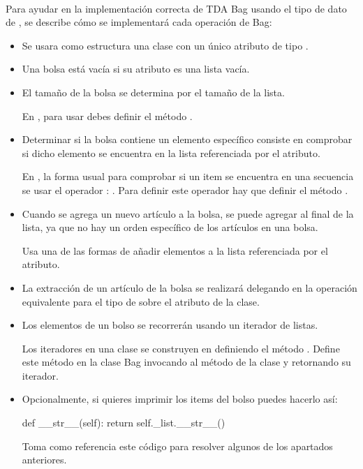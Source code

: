 
\

Para ayudar en la implementación correcta de TDA Bag  usando el tipo de dato  de , se describe cómo se implementará cada operación de Bag:
\begin{itemize}
\item Se usara como estructura una clase con un único atributo de tipo .

\item Una bolsa está vacía si su atributo es una lista vacía.

\item El tamaño de la bolsa se determina por el tamaño de la lista.

En , para usar  debes definir el método .
 
\item Determinar si la bolsa contiene un elemento específico consiste en comprobar si dicho elemento se encuentra en la lista referenciada por el atributo.

En , la forma usual para comprobar si un item se encuentra en una secuencia se usar el operador : . Para definir este operador hay que definir el método .

\item Cuando se agrega un nuevo artículo a la bolsa, se puede agregar al final de la lista, ya que no hay un orden específico de los artículos en una bolsa.

Usa una de las formas de añadir elementos a la lista referenciada por el atributo.

\item La extracción de un artículo de la bolsa se realizará delegando en la operación equivalente para el tipo  de  sobre el atributo de la clase.

\item Los elementos de un bolso se recorrerán usando un iterador de listas.

Los iteradores en una clase se construyen en  definiendo el método .
Define este método en la clase Bag invocando al método   de la clase  y retornando su iterador.

\item Opcionalmente, si quieres imprimir los items del bolso puedes hacerlo así:

\hfil\begin{minipage}{.4\textwidth}
\begin{pyverbatim}[][frame=single]
  def __str__(self):
      return self._list.__str__()
\end{pyverbatim}
\end{minipage}

Toma como referencia este código para resolver algunos de los apartados anteriores.
\end{itemize}

